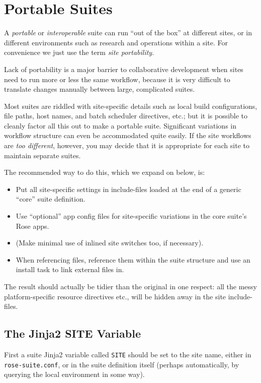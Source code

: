 \section{Portable Suites}
\label{Portable Suites}

A {\em portable} or {\em interoperable} suite can run ``out of the box'' at
different sites, or in different environments such as research and operations
within a site.  For convenience we just use the term {\em site portability}.

Lack of portability is a major barrier to collaborative development when
sites need to run more or less the same workflow, because it is very
difficult to translate changes manually between large, complicated suites.

Most suites are riddled with site-specific details such as local build
configurations, file paths, host names, and batch scheduler directives, etc.;
but it is possible to cleanly factor all this out to make a portable suite.
Significant variations in workflow structure can even be accommodated quite
easily. If the site workflows are {\em too different}, however, you may decide
that it is appropriate for each site to maintain separate suites.

The recommended way to do this, which we expand on below, is:

\begin{itemize}
  \item Put all site-specific settings in include-files loaded at the end
    of a generic ``core'' suite definition.
  \item Use ``optional'' app config files for site-specific variations
    in the core suite's Rose apps.
  \item (Make minimal use of inlined site switches too, if necessary).
  \item When referencing files, reference them within the suite structure and
  use an install task to link external files in.
\end{itemize}

The result should actually be tidier than the original in one respect: all
the messy platform-specific resource directives etc., will be hidden away in
the site include-files.

\subsection{The Jinja2 SITE Variable}

First a suite Jinja2 variable called \lstinline=SITE= should be set to the site
name, either in \lstinline=rose-suite.conf=, or in the suite definition itself
(perhaps automatically, by querying the local environment in some way).


